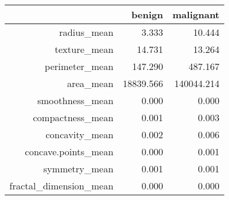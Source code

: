 \begin{table}[H]
\centering
\begin{tabular}{r|rr}
 & benign & malignant \\ 
  \hline
radius\_mean & 3.333 & 10.444 \\ 
  texture\_mean & 14.731 & 13.264 \\ 
  perimeter\_mean & 147.290 & 487.167 \\ 
  area\_mean & 18839.566 & 140044.214 \\ 
  smoothness\_mean & 0.000 & 0.000 \\ 
  compactness\_mean & 0.001 & 0.003 \\ 
  concavity\_mean & 0.002 & 0.006 \\ 
  concave.points\_mean & 0.000 & 0.001 \\ 
  symmetry\_mean & 0.001 & 0.001 \\ 
  fractal\_dimension\_mean & 0.000 & 0.000 \\ 
\end{tabular}
\end{table}